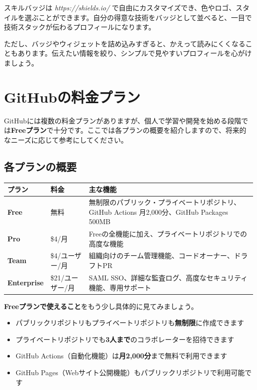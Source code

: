スキルバッジは \textit{https://shields.io/} で自由にカスタマイズでき、色やロゴ、スタイルを選ぶことができます。自分の得意な技術をバッジとして並べると、一目で技術スタックが伝わるプロフィールになります。

ただし、バッジやウィジェットを詰め込みすぎると、かえって読みにくくなることもあります。伝えたい情報を絞り、シンプルで見やすいプロフィールを心がけましょう。

\section{GitHubの料金プラン}

GitHubには複数の料金プランがありますが、個人で学習や開発を始める段階では\textbf{Freeプラン}で十分です。ここでは各プランの概要を紹介しますので、将来的なニーズに応じて参考にしてください。

\subsection{各プランの概要}

\begin{table}[htbp]
\centering
\begin{tabular}{llp{8cm}}
\hline
\textbf{プラン} & \textbf{料金} & \textbf{主な機能} \\
\hline
\textbf{Free} & 無料 & 無制限のパブリック・プライベートリポジトリ、GitHub Actions 月2,000分、GitHub Packages 500MB \\
\textbf{Pro} & \$4/月 & Freeの全機能に加え、プライベートリポジトリでの高度な機能 \\
\textbf{Team} & \$4/ユーザー/月 & 組織向けのチーム管理機能、コードオーナー、ドラフトPR \\
\textbf{Enterprise} & \$21/ユーザー/月 & SAML SSO、詳細な監査ログ、高度なセキュリティ機能、専用サポート \\
\hline
\end{tabular}
\end{table}

\textbf{Freeプランで使えること}をもう少し具体的に見てみましょう。

\begin{itemize}
  \item パブリックリポジトリもプライベートリポジトリも\textbf{無制限}に作成できます
  \item プライベートリポジトリでも\textbf{3人まで}のコラボレーターを招待できます
  \item GitHub Actions（自動化機能）は\textbf{月2,000分}まで無料で利用できます
  \item GitHub Pages（Webサイト公開機能）もパブリックリポジトリで利用可能です
\end{itemize}

